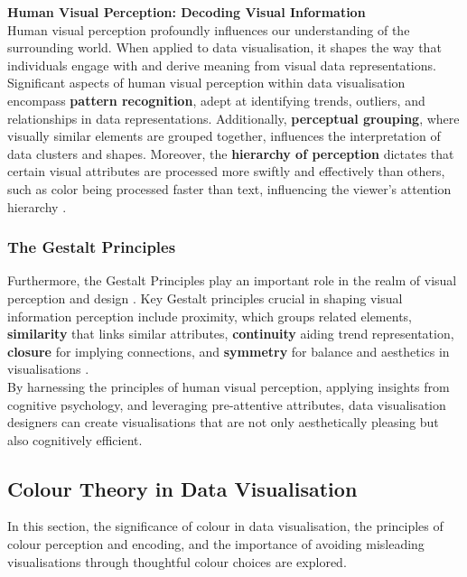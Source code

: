\documentclass{article}\usepackage[]{graphicx}\usepackage[]{xcolor}
\begin{document}
\noindent \textbf{Human Visual Perception: Decoding Visual Information}\\
Human visual perception profoundly influences our understanding of the surrounding world. When applied to data visualisation, it shapes the way that individuals engage with and derive meaning from visual data representations.\\

\noindent 
Significant aspects of human visual perception within data visualisation encompass \textbf{pattern recognition}, adept at identifying trends, outliers, and relationships in data representations. Additionally, \textbf{perceptual grouping}, where visually similar elements are grouped together, influences the interpretation of data clusters and shapes. Moreover, the \textbf{hierarchy of perception} dictates that certain visual attributes are processed more swiftly and effectively than others, such as color being processed faster than text, influencing the viewer's attention hierarchy \cite{dastani2002role}.

\subsubsection{The Gestalt Principles}
Furthermore, the Gestalt Principles play an important role in the realm of visual perception and design \cite{rosli2015gestalt}. Key Gestalt principles crucial in shaping visual information perception include proximity, which groups related elements, \textbf{similarity} that links similar attributes, \textbf{continuity} aiding trend representation, \textbf{closure} for implying connections, and \textbf{symmetry} for balance and aesthetics in visualisations \cite{todorovic2008gestalt}. \\

\noindent By harnessing the principles of human visual perception, applying insights from cognitive psychology, and leveraging pre-attentive attributes, data visualisation designers can create visualisations that are not only aesthetically pleasing but also cognitively efficient.	


\subsection{Colour Theory in Data Visualisation}
In this section, the significance of colour in data visualisation, the principles of colour perception and encoding, and the importance of avoiding misleading visualisations through thoughtful colour choices are explored.\\
\end{document}

